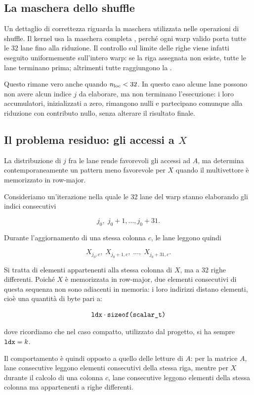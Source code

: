 \subsection{La maschera dello shuffle}

Un dettaglio di correttezza riguarda la maschera utilizzata nelle
operazioni di shuffle. Il kernel usa la maschera completa
, perché ogni warp valido porta tutte le 32 lane fino
alla riduzione. Il controllo sul limite delle righe viene infatti eseguito
uniformemente sull'intero warp: se la riga assegnata non esiste, tutte le
lane terminano prima; altrimenti tutte raggiungono la
.

Questo rimane vero anche quando $n_{\text{loc}} < 32$. In questo caso alcune lane
possono non avere alcun indice $j$ da elaborare, ma non terminano
l'esecuzione: i loro accumulatori, inizializzati a zero, rimangono nulli
e partecipano comunque alla riduzione con contributo nullo, senza
alterare il risultato finale.

\subsection{Il problema residuo: gli accessi a $X$}\label{sec:difetto-x}

La distribuzione di $j$ fra le lane rende favorevoli gli accessi ad $A$,
ma determina contemporaneamente un pattern meno favorevole per $X$ quando
il multivettore è memorizzato in row-major.

Consideriamo un'iterazione nella quale le 32 lane del warp stanno
elaborando gli indici consecutivi

\[
j_0,\;j_0+1,\ldots,j_0+31.
\]

Durante l'aggiornamento di una stessa colonna $c$, le lane leggono quindi

\[
X_{j_0,c},\;
X_{j_0+1,c},\;
\ldots,\;
X_{j_0+31,c}.
\]

Si tratta di elementi appartenenti alla stessa colonna di $X$, ma a 32
righe differenti. Poiché $X$ è memorizzata in row-major, due elementi
consecutivi di questa sequenza non sono adiacenti in memoria: i loro
indirizzi distano  elementi, cioè una quantità di byte pari a:

\[
\texttt{ldx}\cdot \texttt{sizeof(scalar\_t)}
\]

dove ricordiamo che nel caso compatto, utilizzato dal progetto, si ha sempre $\texttt{ldx}=k$.

Il comportamento è quindi opposto a quello delle letture di $A$:
per la matrice $A$, lane consecutive leggono elementi consecutivi della stessa riga,
mentre per $X$ durante il calcolo di una colonna $c$, lane consecutive leggono
elementi della stessa colonna ma appartenenti a righe differenti.

